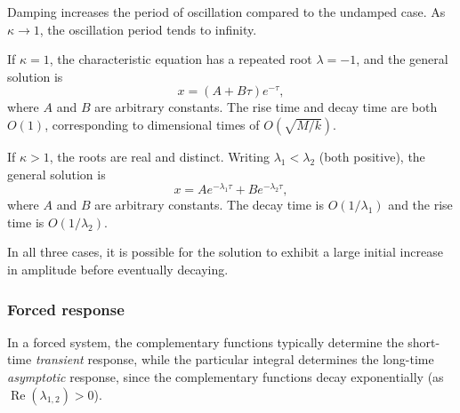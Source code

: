 \documentclass[a4paper]{article}
\begin{document}
\begin{remark}
  Damping increases the period of oscillation compared to the undamped case. As $\kappa \to 1$, the oscillation period tends to infinity.
\end{remark}

\begin{prop}[Critical damping ($\kappa = 1$)]
  If $\kappa = 1$, the characteristic equation has a repeated root $\lambda = -1$, and the general solution is
  \[
    x = (A + B\tau)e^{-\tau},
  \]
  where $A$ and $B$ are arbitrary constants. The rise time and decay time are both $O(1)$, corresponding to dimensional times of $O(\sqrt{M/k})$.
  \begin{center}
  \end{center}
\end{prop}

\begin{prop}
  If $\kappa > 1$, the roots are real and distinct. Writing $\lambda_1 < \lambda_2$ (both positive), the general solution is
  \[
    x = Ae^{-\lambda_1\tau} + Be^{-\lambda_2\tau},
  \]
  where $A$ and $B$ are arbitrary constants. The decay time is $O(1/\lambda_1)$ and the rise time is $O(1/\lambda_2)$.
  \begin{center}
  \end{center}
\end{prop}

\begin{remark}
  In all three cases, it is possible for the solution to exhibit a large initial increase in amplitude before eventually decaying.
\end{remark}

\subsubsection{Forced response}
\begin{remark}
  In a forced system, the complementary functions typically determine the short-time \emph{transient} response, while the particular integral determines the long-time \emph{asymptotic} response, since the complementary functions decay exponentially (as $\operatorname{Re}(\lambda_{1,2}) > 0$).
\end{remark}
\end{document}
